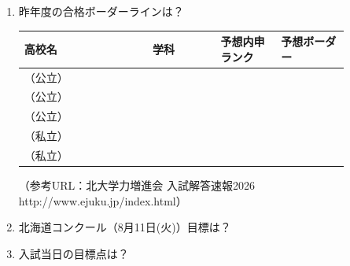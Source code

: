 \begin{enumerate}
  \clearpage

  \item 昨年度の合格ボーダーラインは？
    \vspace{0.25em}
    \begin{center}
    \renewcommand{\arraystretch}{1.85}
    \begin{tabular}{|>{\centering\arraybackslash}p{0.34\linewidth}|>{\centering\arraybackslash}p{0.18\linewidth}|>{\centering\arraybackslash}p{0.16\linewidth}|>{\centering\arraybackslash}p{0.18\linewidth}|}
      \hline
      高校名 & 学科 & 予想内申ランク & 予想ボーダー \\
      \hline
      \raggedright（公立） & & & \\
      \hline
      \raggedright（公立） & & & \\
      \hline
      \raggedright（公立） & & & \\
      \hline
      \raggedright（私立） & & & \\
      \hline
      \raggedright（私立） & & & \\
      \hline
    \end{tabular}
    \end{center}
    {\small （参考URL：北大学力増進会 入試解答速報2026 http://www.ejuku.jp/index.html）}

  \item 北海道コンクール（8月11日(火)）目標は？
    \vspace{0.25em}
    \begin{center}
    \scoretable
    \end{center}

  \item 入試当日の目標点は？
    \vspace{0.25em}
    \begin{center}
    \scoretable
    \end{center}
\end{enumerate}
